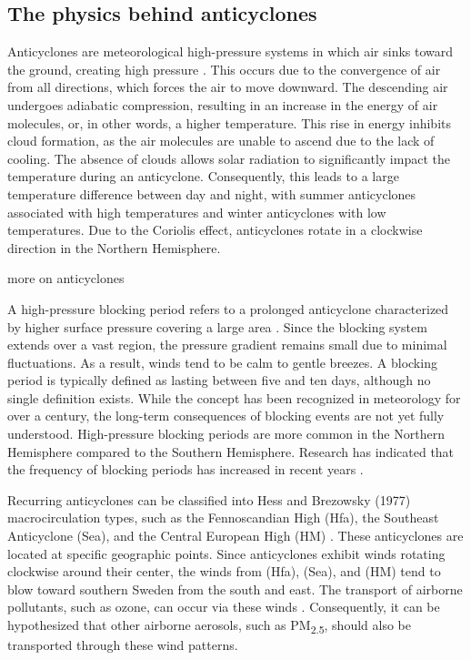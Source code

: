 \subsection{The physics behind anticyclones}
Anticyclones are meteorological high-pressure systems in which air sinks toward the ground, creating high pressure \cite{spiridonovCyclonesAnticyclonesSpringerLink2020}. This occurs due to the convergence of air from all directions, which forces the air to move downward. The descending air undergoes adiabatic compression, resulting in an increase in the energy of air molecules, or, in other words, a higher temperature. This rise in energy inhibits cloud formation, as the air molecules are unable to ascend due to the lack of cooling. The absence of clouds allows solar radiation to significantly impact the temperature during an anticyclone. Consequently, this leads to a large temperature difference between day and night, with summer anticyclones associated with high temperatures and winter anticyclones with low temperatures. Due to the Coriolis effect, anticyclones rotate in a clockwise direction in the Northern Hemisphere.

more on anticyclones

A high-pressure blocking period refers to a prolonged anticyclone characterized by higher surface pressure covering a large area \cite{lupoAtmosphericBlockingEvents2020}. Since the blocking system extends over a vast region, the pressure gradient remains small due to minimal fluctuations. As a result, winds tend to be calm to gentle breezes. A blocking period is typically defined as lasting between five and ten days, although no single definition exists. While the concept has been recognized in meteorology for over a century, the long-term consequences of blocking events are not yet fully understood. High-pressure blocking periods are more common in the Northern Hemisphere compared to the Southern Hemisphere. Research has indicated that the frequency of blocking periods has increased in recent years \cite{lupoAtmosphericBlockingEvents2020}. 

Recurring anticyclones can be classified into Hess and Brezowsky (1977) macrocirculation types, such as the Fennoscandian High (Hfa), the Southeast Anticyclone (Sea), and the Central European High (HM) \cite{bartholyEuropeanCycloneTrack2006}. These anticyclones are located at specific geographic points. Since anticyclones exhibit winds rotating clockwise around their center, the winds from (Hfa), (Sea), and (HM) tend to blow toward southern Sweden from the south and east. The transport of airborne pollutants, such as ozone, can occur via these winds \cite{oteroImpactAtmosphericBlocking2022}. Consequently, it can be hypothesized that other airborne aerosols, such as PM\textsubscript{2.5}, should also be transported through these wind patterns.

